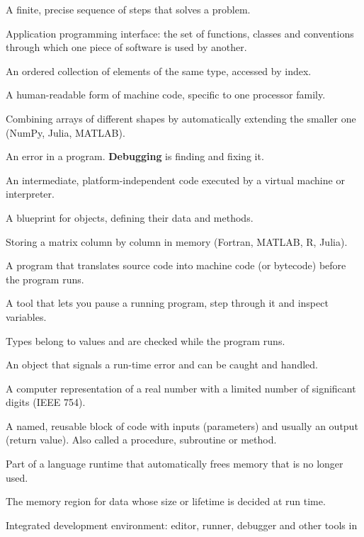 \begin{description}[style=nextline,leftmargin=1.2em,font=\sffamily\bfseries]
\item[Algorithm] A finite, precise sequence of steps that solves a problem.
\item[API] Application programming interface: the set of functions, classes and
  conventions through which one piece of software is used by another.
\item[Array] An ordered collection of elements of the same type, accessed by index.
\item[Assembly language] A human-readable form of machine code, specific to one processor
  family.
\item[Broadcasting] Combining arrays of different shapes by automatically extending the
  smaller one (NumPy, Julia, MATLAB).
\item[Bug] An error in a program. \textbf{Debugging} is finding and fixing it.
\item[Bytecode] An intermediate, platform-independent code executed by a virtual machine
  or interpreter.
\item[Class] A blueprint for objects, defining their data and methods.
\item[Column-major] Storing a matrix column by column in memory (Fortran, MATLAB, R,
  Julia).
\item[Compiler] A program that translates source code into machine code (or bytecode)
  before the program runs.
\item[Debugger] A tool that lets you pause a running program, step through it and inspect
  variables.
\item[Dynamic typing] Types belong to values and are checked while the program runs.
\item[Exception] An object that signals a run-time error and can be caught and handled.
\item[Floating-point number] A computer representation of a real number with a limited
  number of significant digits (IEEE 754).
\item[Function] A named, reusable block of code with inputs (parameters) and usually an
  output (return value). Also called a procedure, subroutine or method.
\item[Garbage collector] Part of a language runtime that automatically frees memory that is
  no longer used.
\item[Heap] The memory region for data whose size or lifetime is decided at run time.
\item[IDE] Integrated development environment: editor, runner, debugger and other tools in

\end{description}
